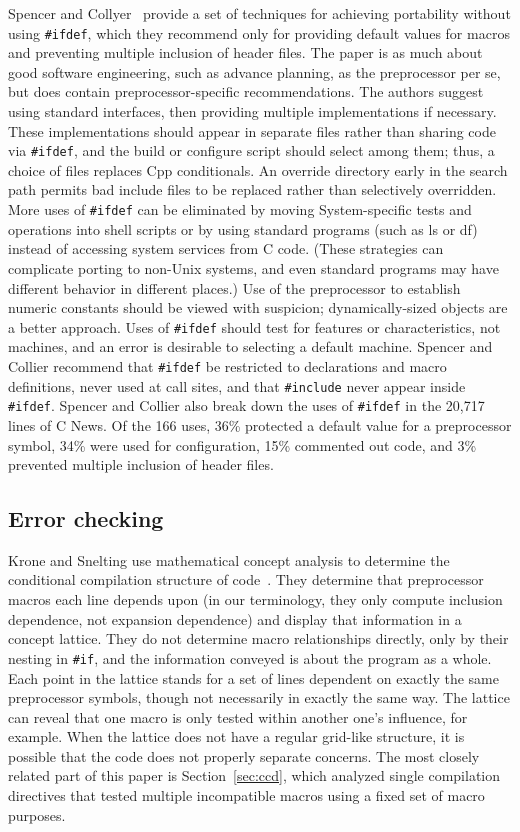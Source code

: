 \documentclass[10pt]{article}
\begin{document}
Spencer and Collyer~\cite{SpencerC92} provide a set of techniques for
achieving portability without using \texttt{\#ifdef}, which they recommend
only for providing default values for macros and preventing multiple
inclusion of header files.  The paper is as much about good software
engineering, such as advance planning, as the preprocessor per se, but does
contain preprocessor-specific recommendations.  The authors suggest using
standard interfaces, then providing multiple implementations if necessary.
These implementations should appear in separate files rather than sharing
code via {\tt \#ifdef}, and the build or configure script should select
among them; thus, a choice of files replaces Cpp conditionals.  An override
directory early in the search path permits bad include files to be replaced
rather than selectively overridden.  More uses of {\tt \#ifdef} can be
eliminated by moving System-specific tests and operations into shell
scripts or by using standard programs (such as {\sf ls} or {\sf df})
instead of accessing system services from C code.  (These strategies can
complicate porting to non-Unix systems, and even standard programs may have
different behavior in different places.)  Use of the preprocessor to
establish numeric constants should be viewed with suspicion;
dynamically-sized objects are a better approach.  Uses of {\tt \#ifdef}
should test for features or characteristics, not machines, and an error is
desirable to selecting a default machine.  Spencer and Collier recommend
that {\tt \#ifdef} be restricted to declarations and macro definitions,
never used at call sites, and that {\tt \#include} never appear inside {\tt
\#ifdef}.  Spencer and Collier also break down the uses of \texttt{\#ifdef}
in the 20,717 lines of C News.  Of the 166 uses, 36\% protected a default
value for a preprocessor symbol, 34\% were used for configuration, 15\%
commented out code, and 3\% prevented multiple inclusion of header files.


\subsection{Error checking}

Krone and Snelting use mathematical concept analysis to determine the
conditional compilation structure of code~\cite{Krone94}.  They determine
that preprocessor macros each line depends upon (in our terminology, they
only compute inclusion dependence, not expansion dependence) and display
that information in a concept lattice.  They do not determine macro
relationships directly, only by their nesting in {\tt \#if}, and
the information conveyed is about the program as a whole.  Each point in
the lattice stands for a set of lines dependent on exactly the same
preprocessor symbols, though not necessarily in exactly the same way.  The
lattice can reveal that one macro is only tested within another one's
influence, for example.  When the lattice does not have a regular grid-like
structure, it is possible that the code does not properly separate
concerns.  The most closely related part of this paper is
Section~\ref{sec:ccd}, which analyzed single compilation directives that
tested multiple incompatible macros using a fixed set of macro purposes.
\end{document}
